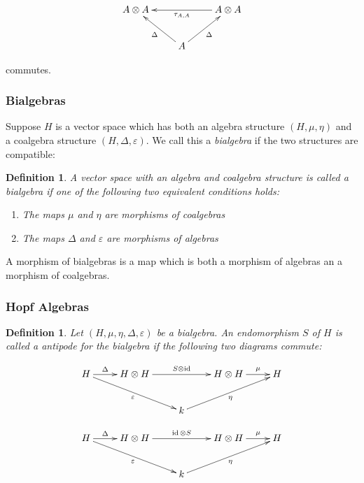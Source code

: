 \documentclass[]{article}
\newtheorem{defn}[theorem]{Definition}
\newcommand{\id}{\operatorname{id}}
\numberwithin{equation}{subsection}
\begin{document}
\begin{equation}
    \xymatrix{
    A \otimes A   & & A \ar[ll]^-{\tau_{A,A}} \otimes A  \\
    & \ar[lu]^-\Delta A \ar[ru]_-\Delta&
    }
\end{equation}

commutes.


\subsubsection{Bialgebras}

Suppose $H$ is a vector space which has both an algebra structure $(H, \mu,
\eta)$ and a coalgebra structure $(H, \Delta, \varepsilon)$. We call this a
\emph{bialgebra} if the two structures are compatible:

\begin{defn}
    A vector space with an algebra and coalgebra structure is called a
    \emph{bialgebra} if one of the following two equivalent conditions holds:

    \begin{enumerate}
        \item The maps $\mu$ and $\eta$ are morphisms of coalgebras
        \item The maps $\Delta$ and $\varepsilon$ are morphisms of algebras
    \end{enumerate}
\end{defn}

A morphism of bialgebras is a map which is both a morphism of algebras an a
morphism of coalgebras.
\subsubsection{Hopf Algebras}


\begin{defn}
    Let $(H, \mu, \eta, \Delta, \varepsilon)$ be a bialgebra. An endomorphism
    $S$ of $H$ is called a \emph{antipode} for the bialgebra if the following
    two diagrams commute:

    \begin{equation}
        \xymatrix{
        H \ar[r]^-{\Delta} \ar[rrd]_-{\varepsilon}& H \otimes H \ar[rr]^-{S \otimes \id} & & H \otimes H \ar[r]^-{\mu} & H \\
        & & k \ar[rru]_-{\eta}& &
        }
    \end{equation}

    \begin{equation}
        \xymatrix{
        H \ar[r]^-{\Delta} \ar[rrd]_-{\varepsilon}& H \otimes H \ar[rr]^-{\id \otimes S} & & H \otimes H \ar[r]^-{\mu} & H \\
        & & k \ar[rru]_-{\eta}& &
        }
    \end{equation}
\end{defn}
\end{document}
